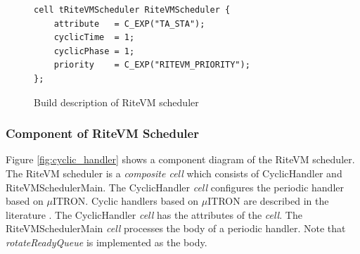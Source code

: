 \documentclass[conference]{IEEEtran/IEEEtran/IEEEtran}
\begin{document}
%
\begin{figure}[t]
    \centering
    \begin{lstlisting}
cell tRiteVMScheduler RiteVMScheduler {
    attribute   = C_EXP("TA_STA");
    cyclicTime  = 1;
    cyclicPhase = 1;
    priority    = C_EXP("RITEVM_PRIORITY");
};
\end{lstlisting}
    \vspace{-3mm}
\caption{Build description of RiteVM scheduler}
    \vspace{-3mm}
\label{build_cyclic_handler}
\end{figure}

\subsubsection{Component of RiteVM Scheduler}

Figure \ref{fig:cyclic_handler} shows a component diagram of the RiteVM scheduler.
The RiteVM scheduler is a {\it composite cell} which consists of CyclicHandler and RiteVMSchedulerMain.
The CyclicHandler {\it cell} configures the periodic handler based on $\mu$ITRON.
Cyclic handlers based on $\mu$ITRON are described in the literature \cite{par:microITRON}.
The CyclicHandler {\it cell} has the attributes of the {\it cell}.
The RiteVMSchedulerMain {\it cell} processes the body of a periodic handler.
Note that {\it rotateReadyQueue} is implemented as the body.
\end{document}
